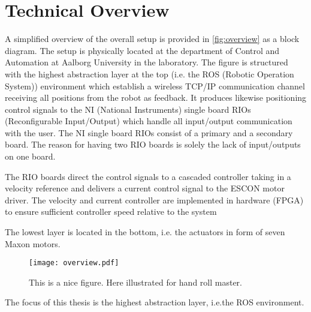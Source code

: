 \section{Technical Overview}
A simplified overview of the overall setup is provided in \autoref{fig:overview} as a block diagram. The setup is physically located at the department of Control and Automation at Aalborg University in the laboratory. The figure is structured with the highest abstraction layer at the top (i.e. the ROS (Robotic Operation System)) environment which establish a wireless TCP/IP communication channel receiving all positions from the robot as feedback. It produces likewise positioning control signals to the NI (National Instruments) single board RIOs (Reconfigurable Input/Output) which handle all input/output communication with the user. The NI single board RIOs consist of a primary and a secondary board. The reason for having two RIO boards is solely the lack of input/outputs on one board.

The RIO boards direct the control signals to a cascaded controller taking in a velocity reference and delivers a current control signal to the ESCON motor driver. The velocity and current controller are implemented in hardware (FPGA) to ensure sufficient controller speed relative to the system \citep{bib:robot_paper}

The lowest layer is located in the bottom, i.e. the actuators in form of seven Maxon motors. 
\begin{figure}[H]
	\center
	\texttt{[image: overview.pdf]}	\caption{This is a nice figure. Here illustrated for hand roll master.}
	\label{fig:overview}
\end{figure}
The focus of this thesis is the highest abstraction layer, i.e.the ROS environment.

